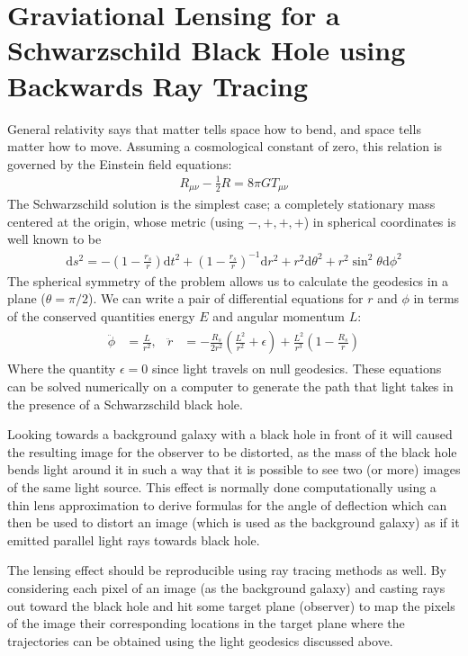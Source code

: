 \documentclass{article}
\begin{document}
\section*{Graviational Lensing for a Schwarzschild Black Hole using Backwards Ray Tracing}
	General relativity says that matter tells space how to bend, and space tells matter how to move. Assuming a cosmological constant of zero, this relation is governed by the Einstein field equations:
	\begin{align}
		R_{\mu\nu}-\frac{1}{2}R=8\pi G T_{\mu\nu}
	\end{align}
	The Schwarzschild solution is the simplest case; a completely stationary mass centered at the origin, whose metric (using \(-,+,+,+\)) in spherical coordinates is well known to be
	\begin{align}
		\mathrm{d}s^{2}=-\left(1-\frac{r_{s}}{r}\right)\mathrm{d}t^{2}+\left(1-\frac{r_{s}}{r}\right)^{-1}\mathrm{d}r^{2}+r^{2}\mathrm{d}\theta^{2}+r^{2}\sin^{2}\theta\mathrm{d}\phi^{2}
	\end{align}
	The spherical symmetry of the problem allows us to calculate the geodesics in a plane (\(\theta=\pi/2\)). We can write a pair of differential equations for \(r\) and \(\phi\) in terms of the conserved quantities energy \(E\) and angular momentum \(L\):
	\begin{align}\label{eq:eom}
		\begin{aligned}
			\ddot{\phi}&=\frac{L}{r^{2}}, & \ddot{r}&=-\frac{R_{s}}{2r^{2}}\left(\frac{L^{2}}{r^{2}}+\epsilon\right)+\frac{L^{2}}{r^{3}}\left(1-\frac{R_{s}}{r}\right)
		\end{aligned}
	\end{align}
	Where the quantity \(\epsilon=0\) since light travels on null geodesics. These equations can be solved numerically on a computer to generate the path that light takes in the presence of a Schwarzschild black hole. 
	
	Looking towards a background galaxy with a black hole in front of it will caused the resulting image for the observer to be distorted, as the mass of the black hole bends light around it in such a way that it is possible to see two (or more) images of the same light source. This effect is normally done computationally using a thin lens approximation to derive formulas for the angle of deflection which can then be used to distort an image (which is used as the background galaxy) as if it emitted parallel light rays towards black hole.
	
	The lensing effect should be reproducible using ray tracing methods as well. By considering each pixel of an image (as the background galaxy) and casting rays out toward the black hole and hit some target plane (observer) to map the pixels of the image their corresponding locations in the target plane where the trajectories can be obtained using the light geodesics discussed above.
	
\end{document}
